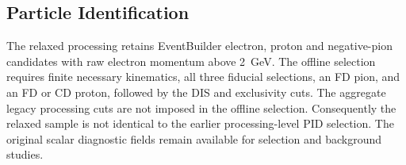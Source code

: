 \subsection{Particle Identification}
The relaxed processing retains EventBuilder electron, proton and negative-pion candidates with raw electron momentum above 2~GeV. The offline selection requires finite necessary kinematics, all three fiducial selections, an FD pion, and an FD or CD proton, followed by the DIS and exclusivity cuts. The aggregate legacy processing cuts are not imposed in the offline selection. Consequently the relaxed sample is not identical to the earlier processing-level PID selection. The original scalar diagnostic fields remain available for selection and background studies.
